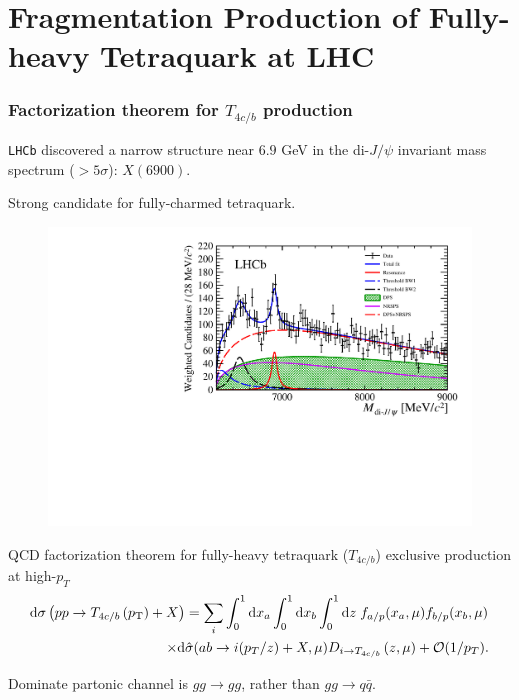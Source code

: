 \section{Fragmentation Production of Fully-heavy Tetraquark at LHC}

\begin{frame}
	\frametitle{Factorization theorem for $T_{4c/b}$ production}

	\begin{itemize}
		\begin{minipage}{0.4\textwidth}
			\item {\tt LHCb} discovered a narrow structure near $6.9$ GeV in the di-$J/\psi$ invariant mass spectrum ($>5\sigma$): $X(6900)$.
			\item Strong candidate for fully-charmed tetraquark.
		\end{minipage}\hfill
		\begin{minipage}{0.5\textwidth}
			\begin{figure}
				\centering
				\includegraphics[width=\textwidth,frame]{Fig3b.pdf}
			\end{figure}
		\end{minipage}
		\item QCD factorization theorem for fully-heavy tetraquark ($T_{4c/b}$) exclusive production at high-$p_T$
		\begin{align}
			\mathrm{d} \sigma\left(p p \rightarrow T_{4c/b}\left(p_{\mathrm{T}}\right)+X\right) &=\sum_{i}\int_0^1 \mathrm{d} x_a  \int_0^1 \mathrm{d} x_b \int_{0}^{1} \mathrm{d} z\; f_{a/p}(x_a,\mu)f_{b/p}(x_b,\mu) \notag\\
			\times  \dd &{\hat \sigma}(a b \rightarrow i(p_T/z)+X, \mu)  D_{i \rightarrow T_{4c/b}}\left(z,\mu\right)+{\cal O}(1/p_T). 
			\label{QCD:fact:theor}
		\end{align}
		\item Dominate partonic channel is $gg\to gg$, rather than $gg\to q\bar{q}$. 
	\end{itemize}

\end{frame}

